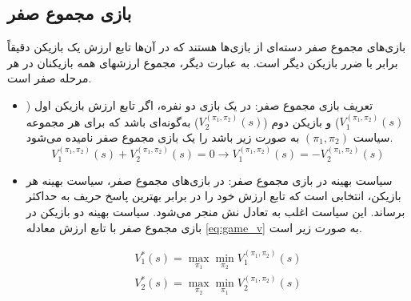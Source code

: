 \subsection{بازی مجموع صفر}

بازی‌های مجموع صفر
 دسته‌ای از بازی‌ها هستند که در آن‌ها تابع ارزش یک بازیکن دقیقاً برابر با ضرر بازیکن دیگر است. به عبارت دیگر، مجموع ارزشهای همه بازیکنان در هر مرحله صفر است.



\begin{itemize}
	\item تعریف بازی مجموع صفر:
	در یک بازی دو نفره، اگر تابع ارزش بازیکن اول (\( V_1^{(\pi_1 ,\pi_2)}(s)
	\)) و بازیکن دوم (\( V_2^{(\pi_1 ,\pi_2)}(s)
	\)) به‌گونه‌ای باشد که برای هر مجموعه سیاست
	\( (\pi_1, \pi_2) \) 
به صورت زیر باشد را یک بازی مجموع صفر نامیده می‌شود.
	\begin{equation}\label{eq:game_v}
		V_1^{(\pi_1 ,\pi_2)}(s) + V_2^{(\pi_1 ,\pi_2)}(s) = 0 \to V_1^{(\pi_1 ,\pi_2)}(s) = -V_2^{(\pi_1 ,\pi_2)}(s)
	\end{equation}
	\item سیاست بهینه در بازی مجموع صفر:
	در بازی‌های مجموع صفر، سیاست بهینه هر بازیکن، انتخابی است که  تابع ارزش خود را در برابر بهترین پاسخ حریف به حداکثر برساند. این سیاست اغلب به تعادل نش منجر می‌شود. سیاست بهینه دو بازیکن در بازی مجموع صفر با تابع  ارزش معادله
	\eqref{eq:game_v}
	به صورت زیر است.
	
	\begin{align}
		V_1^*(s) = \max_{\pi_1} \min_{\pi_2} V_1^{(\pi_1 ,\pi_2)}(s) \\
		V_2^*(s) = \max_{\pi_2} \min_{\pi_1} V_2^{(\pi_1 ,\pi_2)}(s)
	\end{align}
	
	
\end{itemize}


